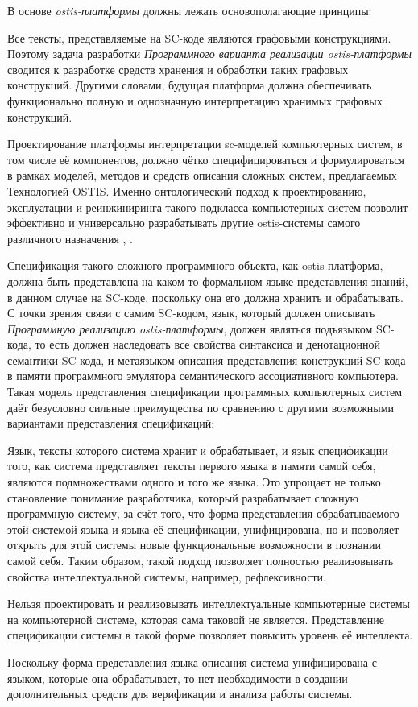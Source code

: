 В основе \textit{ostis-платформы} должны лежать основополагающие принципы:
\begin{textitemize}
    \item Все тексты, представляемые на SC-коде являются графовыми конструкциями. Поэтому задача разработки \textit{Программного варианта реализации ostis-платформы} сводится к разработке средств хранения и обработки таких графовых конструкций. Другими словами, будущая платформа должна обеспечивать функционально полную и однозначную интерпретацию хранимых графовых конструкций.
    \item Проектирование платформы интерпретации sc-моделей компьютерных систем, в том числе её компонентов, должно чётко специфицироваться и формулироваться в рамках моделей, методов и средств описания сложных систем, предлагаемых Технологией OSTIS. Именно онтологический подход к проектированию, эксплуатации и реинжиниринга такого подкласса компьютерных систем позволит эффективно и универсально разрабатывать другие ostis-системы самого различного назначения \cite{Molorodov2019}, .
\end{textitemize}

Спецификация такого сложного программного объекта, как ostis-платформа, должна быть представлена на каком-то формальном языке представления знаний, в данном случае на SC-коде, поскольку она его должна хранить и обрабатывать. С точки зрения связи с самим SC-кодом, язык, который должен описывать \textit{Программную реализацию ostis-платформы}, должен являться подъязыком SC-кода, то есть должен наследовать все свойства синтаксиса и денотационной семантики SC-кода, и метаязыком описания представления конструкций SC-кода в памяти программного эмулятора семантического ассоциативного компьютера. Такая модель представления спецификации программных компьютерных систем даёт безусловно сильные преимущества по сравнению с другими возможными вариантами представления спецификаций:
\begin{textitemize}
    \item Язык, тексты которого система хранит и обрабатывает, и язык спецификации того, как система представляет тексты первого языка в памяти самой себя, являются подмножествами одного и того же языка. Это упрощает не только становление понимание разработчика, который разрабатывает сложную программную систему, за счёт того, что форма представления обрабатываемого этой системой языка и языка её спецификации, унифицирована, но и позволяет открыть для этой системы новые функциональные возможности в познании самой себя. Таким образом, такой подход позволяет полностью реализовывать свойства интеллектуальной системы, например, рефлексивности.
    \item Нельзя проектировать и реализовывать интеллектуальные компьютерные системы на компьютерной системе, которая сама таковой не является. Представление спецификации системы в такой форме позволяет повысить уровень её интеллекта.
    \item Поскольку форма представления языка описания система унифицирована с языком, которые она обрабатывает, то нет необходимости в создании дополнительных средств для верификации и анализа работы системы.
\end{textitemize}

